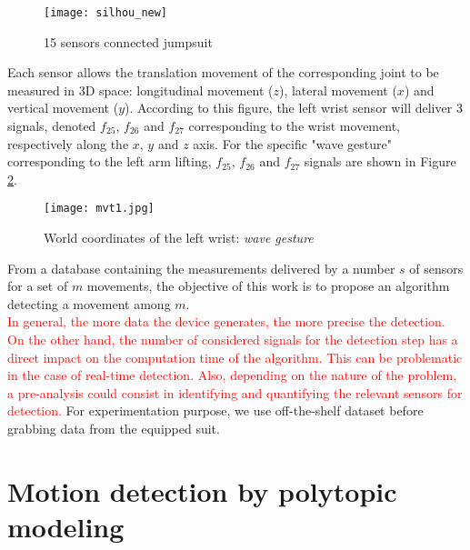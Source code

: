 \documentclass[letterpaper, 10 pt, conference]{ieeeconf}  %
\begin{document}
\begin{figure}[h]
	\begin{center}
		\texttt{[image: silhou\_new]}
		\caption{15 sensors connected jumpsuit} 
		\label{fig:silhounew22}
	\end{center}
\end{figure}

Each sensor allows the translation movement of the corresponding joint to be measured in 3D space: longitudinal movement ($z$), lateral movement ($x$) and vertical movement ($y$). According to this figure, the left wrist sensor will deliver $3$ signals, denoted $f_{25}$, $f_{26}$ and $f_{27}$ corresponding to the wrist movement, respectively along the $x$, $y$ and $z$ axis. For the specific "wave gesture" corresponding to the left arm lifting, $f_{25}$, $f_{26}$ and $f_{27}$ signals are shown in Figure \ref{fig:wave}.

\begin{figure}[h]
	\begin{center}
		\texttt{[image: mvt1.jpg]}
		\caption{World coordinates of the left wrist: \textit{wave gesture}} 
		\label{fig:wave}
	\end{center}
\end{figure}

From a database containing the measurements delivered by a number $s$ of sensors for a set of $m$ movements, the objective of this work is to propose an algorithm detecting a movement among $m$.\\
\textcolor{red}{In general, the more data the device generates, the more precise the detection. On the other hand, the number of considered signals for the detection step has a direct impact on the computation time of the algorithm. This can be problematic in the case of real-time detection. Also, depending on the nature of the problem, a pre-analysis could consist in identifying and quantifying the relevant sensors for detection.}
For experimentation purpose, we use off-the-shelf dataset before grabbing data from the equipped suit. 

\section{Motion detection by polytopic modeling}
\end{document}
